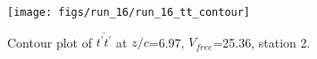 \begin{figure}[H]
\centering
\texttt{[image: figs/run\_16/run\_16\_tt\_contour]}
\caption{Contour plot of $\overline{t^\prime t^\prime}$ at $z/c$=6.97, $V_{free}$=25.36, station 2.}
\label{fig:run_16_tt_contour}
\end{figure}


